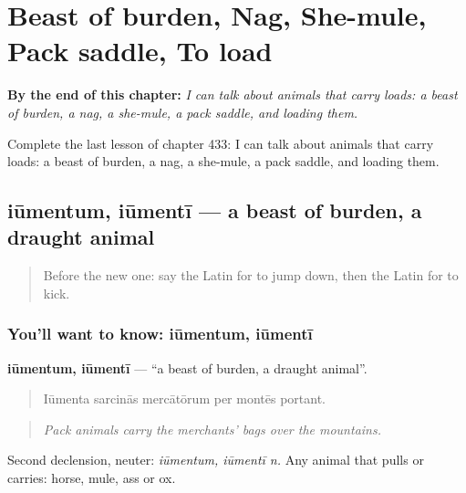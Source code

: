 
\chapter{Beast of burden, Nag, She-mule, Pack saddle, To load}
\label{ch:la-beast-of-burden-nag-she-mule-pack-saddle-to-load}

\begin{chapteropening}
\textbf{By the end of this chapter:} \emph{I can talk about animals that carry loads: a beast of burden, a nag, a she-mule, a pack saddle, and loading them.}

Complete the last lesson of chapter 433: I can talk about animals that carry loads: a beast of burden, a nag, a she-mule, a pack saddle, and loading them.
\end{chapteropening}

\section[iūmentum, iūmentī]{iūmentum, iūmentī — a beast of burden, a draught animal}

\label{lesson:LA-C433-iumentum}



\begin{quote}
Before the new one: say the Latin for to jump down, then the Latin for to kick.
\end{quote}

\subsection*{You'll want to know: iūmentum, iūmentī}
\textbf{iūmentum, iūmentī} — \textquotedblleft{}a beast of burden, a draught animal\textquotedblright{}.

\begin{quote}
Iūmenta sarcinās mercātōrum per montēs portant.
\end{quote}

\begin{quote}
\emph{Pack animals carry the merchants' bags over the mountains.}
\end{quote}

Second declension, neuter: \emph{iūmentum, iūmentī n.} Any animal that pulls or carries: horse, mule, ass or ox.


